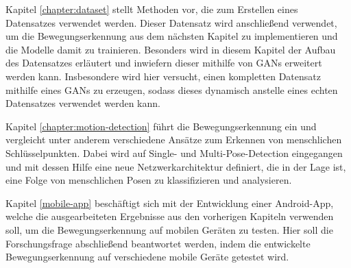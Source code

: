 Kapitel \ref{chapter:dataset} stellt Methoden vor, die zum Erstellen eines
Datensatzes verwendet werden. Dieser Datensatz wird anschließend verwendet, um
die Bewegungserkennung aus dem nächsten Kapitel zu implementieren und die
Modelle damit zu trainieren. Besonders wird in diesem Kapitel der Aufbau des
Datensatzes erläutert und inwiefern dieser mithilfe von GANs erweitert werden
kann. Insbesondere wird hier versucht, einen kompletten Datensatz mithilfe eines
GANs zu erzeugen, sodass dieses dynamisch anstelle eines echten Datensatzes
verwendet werden kann.

Kapitel \ref{chapter:motion-detection} führt die Bewegungserkennung ein und
vergleicht unter anderem verschiedene Ansätze zum Erkennen von menschlichen
Schlüsselpunkten. Dabei wird auf Single- und Multi-Pose-Detection eingegangen
und mit dessen Hilfe eine neue Netzwerkarchitektur definiert, die in der Lage
ist, eine Folge von menschlichen Posen zu klassifizieren und analysieren.

Kapitel \ref{mobile-app} beschäftigt sich mit der Entwicklung einer
Android-App, welche die ausgearbeiteten Ergebnisse aus den vorherigen Kapiteln
verwenden soll, um die Bewegungserkennung auf mobilen Geräten zu testen.
Hier soll die Forschungsfrage abschließend beantwortet werden, indem
die entwickelte Bewegungserkennung auf verschiedene mobile Geräte getestet wird.
